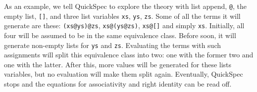 As an example, we tell QuickSpec to explore the theory with list append,
\verb~@~, the empty list, \verb~[]~, and three list variables \verb~xs~,
\verb~ys~, \verb~zs~. Some of all the terms it will generate are these:
\verb~(xs@ys)@zs~, \verb~xs@(ys@zs)~, \verb~xs@[]~ and simply \verb~xs~.
Initially, all four will be assumed to be in the same equivalence class.
Before soon, it will generate non-empty lists for \verb~ys~ and \verb~zs~.
Evaluating the terms with such assignments will split this equivalence class
into two: one with the former two and one with the latter. After this, more
values will be generated for these lists variables, but no evaluation will make
them split again. Eventually, QuickSpec stops and the equations for
associativity and right identity can be read off.

